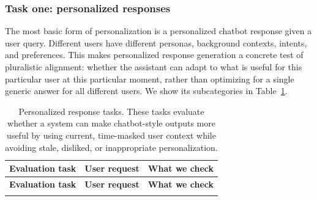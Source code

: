 \documentclass[]{fairmeta}
\begin{document}
\subsubsection{Task one: personalized responses}
The most basic form of personalization is a personalized chatbot response given a user query. Different users have different personas, background contexts, intents, and preferences. This makes personalized response generation a concrete test of pluralistic alignment: whether the assistant can adapt to what is useful for this particular user at this particular moment, rather than optimizing for a single generic answer for all different users. We show its subcategories in Table~\ref{tab:personalized_response_tasks}.

{\footnotesize
\setlength{\tabcolsep}{4pt}
\begin{longtable}{p{}p{}p{}}
\caption{Personalized response tasks. These tasks evaluate whether a system can make chatbot-style outputs more useful by using current, time-masked user context while avoiding stale, disliked, or inappropriate personalization.}
\label{tab:personalized_response_tasks} \\
\toprule
\textbf{Evaluation task} & \textbf{User request} & \textbf{What we check} \\
\midrule
\endfirsthead

\toprule
\textbf{Evaluation task} & \textbf{User request} & \textbf{What we check} \\
\midrule
\endhead

\bottomrule
\endlastfoot


\end{longtable}}
\end{document}
